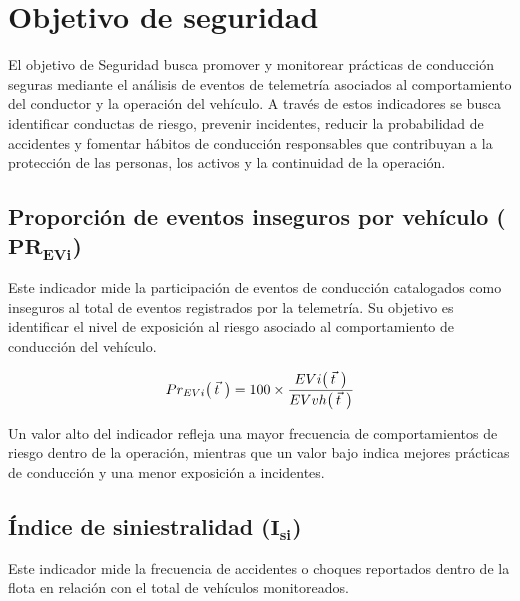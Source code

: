 
\section{Objetivo de seguridad}
El objetivo de Seguridad busca promover y monitorear prácticas de conducción seguras mediante el análisis de eventos de telemetría asociados al comportamiento del conductor y la operación del vehículo. A través de estos indicadores se busca identificar conductas de riesgo, prevenir incidentes, reducir la probabilidad de accidentes y fomentar hábitos de conducción responsables que contribuyan a la protección de las personas, los activos y la continuidad de la operación.

\subsection{Proporción de eventos inseguros por vehículo (\texorpdfstring{$\mathbf{PR}_{\mathbf{EVi}}$}{PR\_EVi})}
Este indicador mide la participación de eventos de conducción catalogados como inseguros al total de eventos registrados por la telemetría. Su objetivo es identificar el nivel de exposición al riesgo asociado al comportamiento de conducción del vehículo.


\begin{equation*}
    Pr_{EVi} \big( \hspace{0.07cm} \smash{\vec{t}}\,\vphantom{t} \hspace{0.07cm} \big) = 100 \times \frac{EVi \big( \hspace{0.07cm} \smash{\vec{t}}\,\vphantom{t} \hspace{0.07cm} \big)}{EVvh \big( \hspace{0.07cm} \smash{\vec{t}}\,\vphantom{t} \hspace{0.07cm} \big)}
\end{equation*} %
 

Un valor alto del indicador refleja una mayor frecuencia de comportamientos de riesgo dentro de la operación, mientras que un valor bajo indica mejores prácticas de conducción y una menor exposición a incidentes.

\subsection{Índice de siniestralidad (\texorpdfstring{$\mathbf{I}_{\mathbf{si}}$}{I siniestralidad})}
Este indicador mide la frecuencia de accidentes o choques reportados dentro de la flota en relación con el total de vehículos monitoreados.


